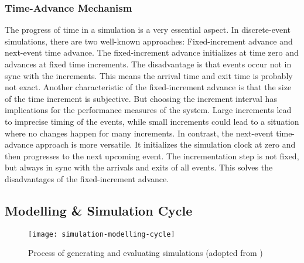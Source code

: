 \subsubsection{Time-Advance Mechanism}
\label{des:timeadvance}

The progress of time in a simulation is a very essential aspect. In discrete-event simulations, there are two well-known approaches: Fixed-increment advance and next-event time advance.
The fixed-increment advance initializes at time zero and advances at fixed time increments. The disadvantage is that events occur not in sync with the increments. This means the arrival time and exit time is probably not exact. Another characteristic of the fixed-increment advance is that the size of the time increment is subjective. But choosing the increment interval has implications for the performance measures of the system. Large increments lead to imprecise timing of the events, while small increments could lead to a situation where no changes happen for many increments.
In contrast, the next-event time-advance approach is more versatile. It initializes the simulation clock at zero and then progresses to the next upcoming event. The incrementation step is not fixed, but always in sync with the arrivals and exits of all events. This solves the disadvantages of the fixed-increment advance.





\subsection{Modelling \& Simulation Cycle}

\begin{figure}[h!]
 \caption{Process of generating and evaluating simulations (adopted from \cite[page 7]{sokolowski2010modeling})}
 \centering
\texttt{[image: simulation-modelling-cycle]}
\label{fig:ms-cycle}
\end{figure}

